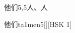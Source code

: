 \begin{entry}{他们}{5,5}{⼈、⼈}
  \begin{phonetics}{他们}{ta1men5}[][HSK 1]
  \end{phonetics}
\end{entry}
